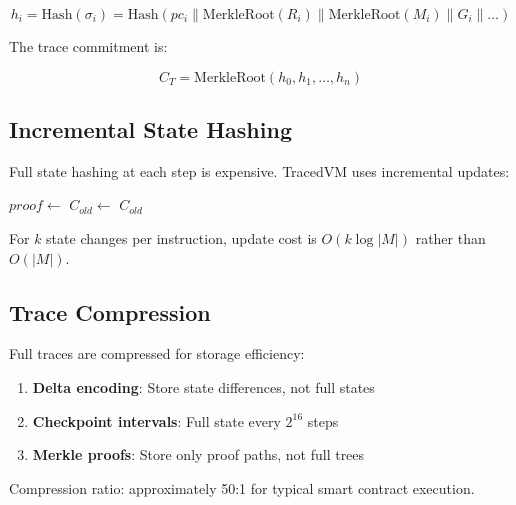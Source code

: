 \documentclass[11pt,a4paper]{article}
\begin{document}
\begin{equation}
    h_i = \text{Hash}(\sigma_i) = \text{Hash}(pc_i \| \text{MerkleRoot}(R_i) \| \text{MerkleRoot}(M_i) \| G_i \| \ldots)
\end{equation}

The trace commitment is:

\begin{equation}
    C_T = \text{MerkleRoot}(h_0, h_1, \ldots, h_n)
\end{equation}

\subsection{Incremental State Hashing}

Full state hashing at each step is expensive. TracedVM uses incremental updates:

\begin{algorithm}
\caption{Incremental State Commitment}
\begin{algorithmic}[1]
        \State $proof \gets$ 
        \State $C_{old} \gets$ 
    \EndFor
    \State \Return $C_{old}$
\EndProcedure
\end{algorithmic}
\end{algorithm}

For $k$ state changes per instruction, update cost is $O(k \log |M|)$ rather than $O(|M|)$.

\subsection{Trace Compression}

Full traces are compressed for storage efficiency:

\begin{enumerate}
    \item \textbf{Delta encoding}: Store state differences, not full states
    \item \textbf{Checkpoint intervals}: Full state every $2^{16}$ steps
    \item \textbf{Merkle proofs}: Store only proof paths, not full trees
\end{enumerate}

Compression ratio: approximately 50:1 for typical smart contract execution.
\end{document}

